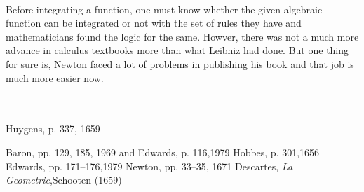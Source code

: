 \documentclass[a4paper,reqno,11pt]{book}
\theoremstyle{plain}%
\theoremstyle{definition}
\begin{document}
\\
\indent Before integrating a function, one must know whether the given algebraic function can be integrated or not with the set of rules they have and mathematicians found the logic for the same. Howver, there was not a much more advance in calculus textbooks more than what Leibniz had done. But one thing for sure is, Newton faced a lot of problems in publishing his book and that job is much more easier now.
\\
\\
\\
\begin{thebibliography}{99}
		
		 Huygens, p. 337, 1659
		
		 Baron, pp. 129, 185, 1969 and
Edwards, p. 116,1979
   Hobbes, p. 301,1656
   Edwards, pp. 171–176,1979
   Newton, pp. 33–35, 1671
      Descartes, \textit{La Geometrie},Schooten (1659)
		

		
		
	\end{thebibliography}
	


	
	
	
	






 

















  
  
  







































	













 
\end{document}
